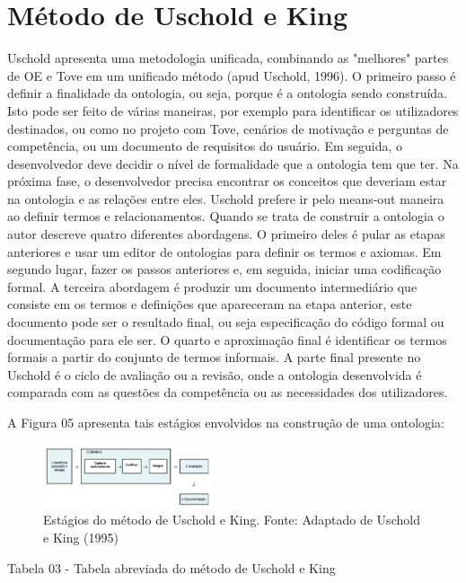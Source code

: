 \documentclass[a4paper]{report}
\begin{document}
\section{Método de Uschold e King} 
\qquad Uschold apresenta uma metodologia unificada, combinando as "melhores" partes de OE e Tove em um unificado método (apud Uschold, 1996). O primeiro passo é definir a finalidade da ontologia, ou seja, porque é a ontologia sendo construída. Isto pode ser feito de várias maneiras, por exemplo para identificar os utilizadores destinados, ou como no projeto com Tove, cenários de motivação e perguntas de competência, ou um documento de requisitos do usuário. Em seguida, o desenvolvedor deve decidir o nível de formalidade que a ontologia tem que ter. Na próxima fase, o desenvolvedor precisa encontrar os conceitos que deveriam estar na ontologia e as relações entre eles. Uschold prefere ir pelo means-out maneira ao definir termos e relacionamentos. Quando se trata de construir a ontologia o autor descreve quatro diferentes abordagens. O primeiro deles é pular as etapas anteriores e usar um editor de ontologias para definir os termos e axiomas. Em segundo lugar, fazer os passos anteriores e, em seguida, iniciar uma codificação formal. A terceira abordagem é produzir um documento intermediário que consiste em os termos e definições que apareceram na etapa anterior, este documento pode ser o resultado final, ou seja especificação do código formal ou documentação para ele ser. O quarto e aproximação final é identificar os termos formais a partir do conjunto de termos informais. A parte final presente no Uschold é o ciclo de avaliação ou a revisão, onde a ontologia desenvolvida é comparada com as questões da competência ou as necessidades dos utilizadores. 

A Figura 05 apresenta tais estágios envolvidos na construção de uma ontologia:

\begin{figure}[h] 
\centering %
\includegraphics[width=5cm]{Figuras/5.png} %
\caption{Estágios do método de Uschold e King.
Fonte: Adaptado de Uschold e King (1995)}
\end{figure}

Tabela 03 - Tabela abreviada do método de Uschold e King
\end{document}
